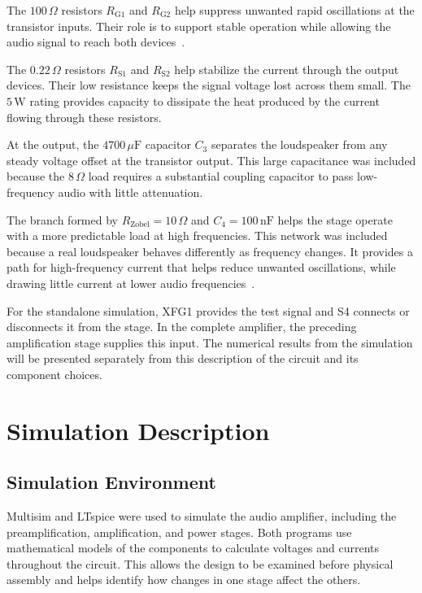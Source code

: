 \documentclass[conference]{IEEEtran}
\begin{document}
The $100\,\Omega$ resistors $R_{\mathrm{G1}}$ and $R_{\mathrm{G2}}$ help suppress unwanted rapid oscillations at the transistor inputs. Their role is to support stable operation while allowing the audio signal to reach both devices~\cite{mosfet_audio}.

The $0.22\,\Omega$ resistors $R_{\mathrm{S1}}$ and $R_{\mathrm{S2}}$ help stabilize the current through the output devices. Their low resistance keeps the signal voltage lost across them small. The $5\,\mathrm{W}$ rating provides capacity to dissipate the heat produced by the current flowing through these resistors.

At the output, the $4700\,\mu\mathrm{F}$ capacitor $C_3$ separates the loudspeaker from any steady voltage offset at the transistor output. This large capacitance was included because the $8\,\Omega$ load requires a substantial coupling capacitor to pass low-frequency audio with little attenuation.

The branch formed by $R_{\mathrm{Zobel}}=10\,\Omega$ and $C_4=100\,\mathrm{nF}$ helps the stage operate with a more predictable load at high frequencies. This network was included because a real loudspeaker behaves differently as frequency changes. It provides a path for high-frequency current that helps reduce unwanted oscillations, while drawing little current at lower audio frequencies~\cite{mosfet_audio}.

For the standalone simulation, XFG1 provides the test signal and S4 connects or disconnects it from the stage. In the complete amplifier, the preceding amplification stage supplies this input. The numerical results from the simulation will be presented separately from this description of the circuit and its component choices.

\section{Simulation Description}

\subsection{Simulation Environment}
Multisim and LTspice were used to simulate the audio amplifier, including the preamplification, amplification, and power stages. Both programs use mathematical models of the components to calculate voltages and currents throughout the circuit. This allows the design to be examined before physical assembly and helps identify how changes in one stage affect the others.
\end{document}
